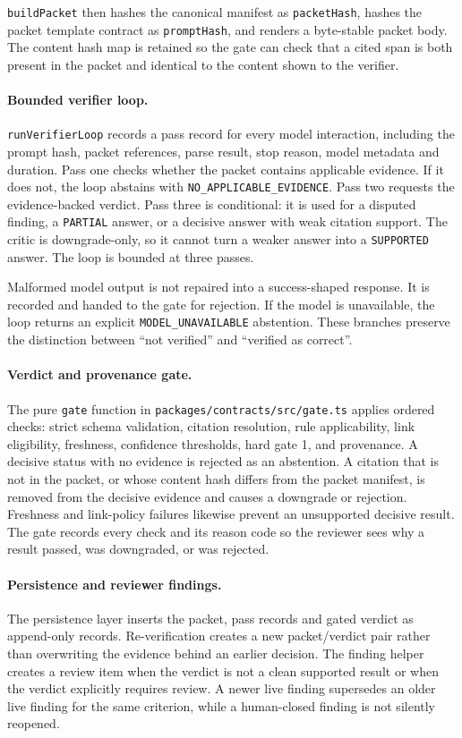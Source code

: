 \texttt{buildPacket} then hashes the canonical manifest as \texttt{packetHash},
hashes the packet template contract as \texttt{promptHash}, and renders a
byte-stable packet body. The content hash map is retained so the gate can
check that a cited span is both present in the packet and identical to the
content shown to the verifier.

\paragraph{Bounded verifier loop.}
\texttt{runVerifierLoop} records a pass record for every model interaction,
including the prompt hash, packet references, parse result, stop reason,
model metadata and duration. Pass one checks whether the packet contains
applicable evidence. If it does not, the loop abstains with
\texttt{NO\_APPLICABLE\_EVIDENCE}. Pass two requests the evidence-backed
verdict. Pass three is conditional: it is used for a disputed finding, a
\texttt{PARTIAL} answer, or a decisive answer with weak citation support.
The critic is downgrade-only, so it cannot turn a weaker answer into a
\texttt{SUPPORTED} answer. The loop is bounded at three passes.

Malformed model output is not repaired into a success-shaped response. It is
recorded and handed to the gate for rejection. If the model is unavailable,
the loop returns an explicit \texttt{MODEL\_UNAVAILABLE} abstention. These
branches preserve the distinction between ``not verified'' and ``verified
as correct''.

\paragraph{Verdict and provenance gate.}
The pure \texttt{gate} function in
\texttt{packages/contracts/src/gate.ts} applies ordered checks: strict schema
validation, citation resolution, rule applicability, link eligibility,
freshness, confidence thresholds, hard gate 1, and provenance. A decisive
status with no evidence is rejected as an abstention. A citation that is not
in the packet, or whose content hash differs from the packet manifest, is
removed from the decisive evidence and causes a downgrade or rejection.
Freshness and link-policy failures likewise prevent an unsupported decisive
result. The gate records every check and its reason code so the reviewer sees
why a result passed, was downgraded, or was rejected.

\paragraph{Persistence and reviewer findings.}
The persistence layer inserts the packet, pass records and gated verdict as
append-only records. Re-verification creates a new packet/verdict pair rather
than overwriting the evidence behind an earlier decision. The finding helper
creates a review item when the verdict is not a clean supported result or
when the verdict explicitly requires review. A newer live finding supersedes
an older live finding for the same criterion, while a human-closed finding is
not silently reopened.

